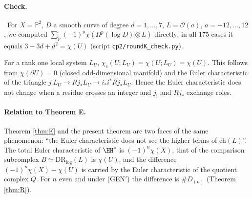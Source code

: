 \paragraph{Check.} \tV\ For $X=\mathbb P^2$, $D$ a smooth curve of degree $d=1,\dots,7$, $L=\mathcal O(a)$, $a=-12,\dots,12$, we computed $\sum_p(-1)^p\chi(\Omega^p(\log D)\otimes L)$ directly: in all 175 cases it equals $3-3d+d^2=\chi(U)$ (script \texttt{cp2/roundK\_check.py}).

\begin{cor}\label{cor:wall}
For a rank one local system $L_U$, $\chi_c(U;L_U)=\chi(U;L_U)=\chi(U)$. This follows from $\chi(\partial U)=0$ (closed odd-dimensional manifold) and the Euler characteristic of the triangle $j_!L_U\to Rj_*L_U\to i_*i^*Rj_*L_U$. Hence the Euler characteristic does not change when a residue crosses an integer and $j_!$ and $Rj_*$ exchange roles.
\end{cor}
\paragraph{Relation to Theorem E.} Theorem \ref{thm:E} and the present theorem are two faces of the same phenomenon: ``the Euler characteristic does not see the higher terms of $\mathrm{ch}(L)$''. The total Euler characteristic of $\HH^*$ is $(-1)^n\chi(X)$, that of the comparison subcomplex $B\simeq\mathrm{DR}_{\log}(L)$ is $\chi(U)$, and the difference $(-1)^n\chi(X)-\chi(U)$ is carried by the Euler characteristic of the quotient complex $Q$. For $n$ even and under (GEN$'$) the difference is $\#D_{(n)}$ (Theorem \ref{thm:R}).

